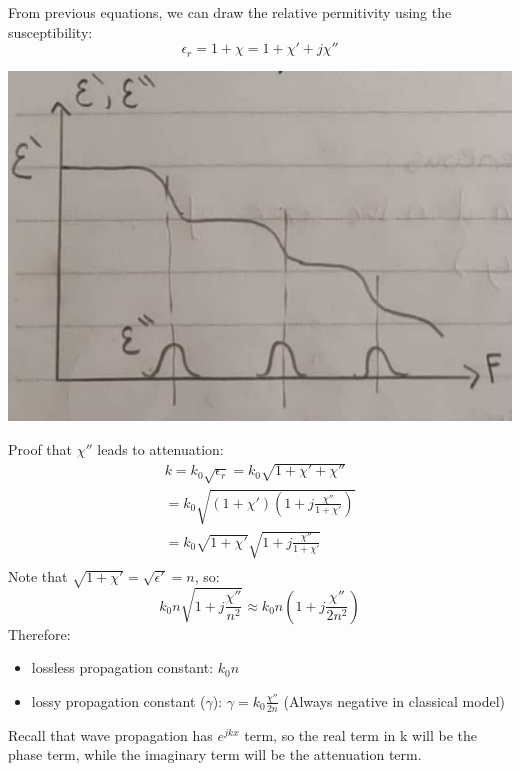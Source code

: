 \documentclass[11pt]{article}
\begin{document}
From previous equations, we can draw the relative permitivity using the susceptibility:
\[
    \epsilon_r = 1 + \chi = 1 + \chi' + j\chi''
\]
\begin{center}
    \includegraphics[scale=0.5]{5.png}
\end{center}
Proof that $\chi''$ leads to attenuation:
\begin{align*}
    k = k_0\sqrt{\epsilon_r} = k_0\sqrt{1 + \chi' + \chi''} \\
    = k_0\sqrt{(1+\chi') \left( 1+j\frac{\chi''}{1+\chi'} \right)} \\
    = k_0\sqrt{1+\chi'}\sqrt{1+j\frac{\chi''}{1+\chi'}} \\
\end{align*}
Note that $\sqrt{1+\chi'} = \sqrt{\epsilon'} = n$, so:
\[k_0n \sqrt{1+j\frac{\chi''}{n^2}} \approx k_0n \left(1 + j \frac{\chi''}{2n^2}\right)\]
Therefore:
\begin{itemize}
    \item lossless propagation constant: $k_0n$
    \item lossy propagation constant ($\gamma$): $\gamma = k_0\frac{\chi''}{2n}$ (Always negative in classical model)
\end{itemize}
Recall that wave propagation has $e^{jkx}$ term, so the real term in k will be the phase term, while the imaginary term will be the attenuation term.
\end{document}
